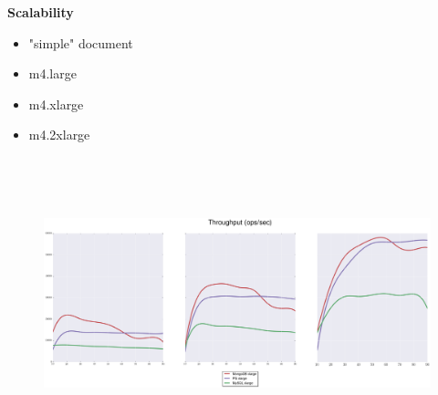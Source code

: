 \documentclass[usenames,dvipsnames, 18pt, compress, aspectratio=169]{beamer}
\begin{document}

\begin{frame}
    \frametitle{}
    \begin{center}
        \textbf{Scalability}
        \begin{itemize}[label={}]
            \item "simple" document
            \item m4.large
            \item m4.xlarge
            \item m4.2xlarge
        \end{itemize}
    \end{center}
\end{frame}

\begin{frame}
    \frametitle{}
    \begin{center}
    \begin{figure}
        \includegraphics[height=8cm,width=1.1\textwidth,center]{benchmarks/scalability_select_throughput.png}
    \end{figure}
    \end{center}
\end{frame}

\end{document}
